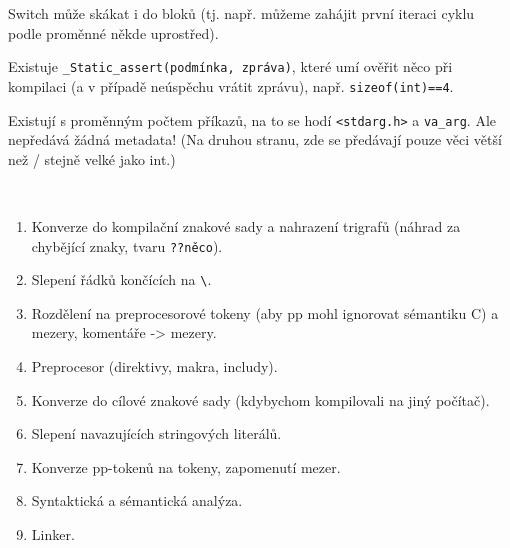 \documentclass[12pt]{article}                   %
\begin{document}
    \begin{poznamka}
        Switch může skákat i do bloků (tj. např. můžeme zahájit první iteraci cyklu podle proměnné někde uprostřed).
    \end{poznamka}

    \begin{definice}
        Existuje \verb|_Static_assert(podmínka, zpráva)|, které umí ověřit něco při kompilaci (a v případě neúspěchu vrátit zprávu), např. \verb|sizeof(int)==4|.
    \end{definice}

    \begin{poznamka}
        Existují s proměnným počtem příkazů, na to se hodí \verb|<stdarg.h>| a \verb|va_arg|. Ale nepředává žádná metadata! (Na druhou stranu, zde se předávají pouze věci větší než / stejně velké jako int.)
    \end{poznamka}

    \begin{definice}
        \ 
        \begin{enumerate}
            \item Konverze do kompilační znakové sady a nahrazení trigrafů (náhrad za chybějící znaky, tvaru \verb|??něco|).
            \item Slepení řádků končících na \verb|\|.
            \item Rozdělení na preprocesorové tokeny (aby pp mohl ignorovat sémantiku C) a mezery, komentáře -> mezery.
            \item Preprocesor (direktivy, makra, includy).
            \item Konverze do cílové znakové sady (kdybychom kompilovali na jiný počítač).
            \item Slepení navazujících stringových literálů.
            \item Konverze pp-tokenů na tokeny, zapomenutí mezer.
            \item Syntaktická a sémantická analýza.
            \item Linker.
        \end{enumerate}
    \end{definice}
\end{document}
